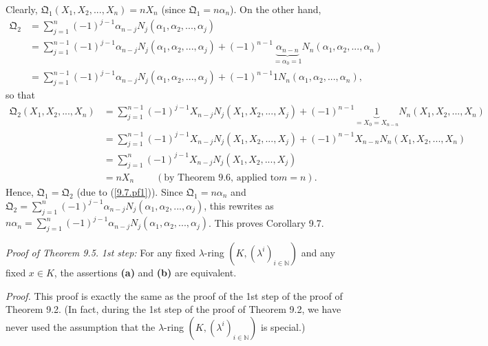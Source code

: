\documentclass[numbers=enddot,12pt,final,onecolumn,notitlepage]{scrartcl}%
\begin{document}
Clearly, $\mathfrak{Q}_{1}\left(  X_{1},X_{2},...,X_{n}\right)  =nX_{n}$
(since $\mathfrak{Q}_{1}=n\alpha_{n}$). On the other hand,
\begin{align*}
\mathfrak{Q}_{2}  &  =\sum\limits_{j=1}^{n}\left(  -1\right)  ^{j-1}%
\alpha_{n-j}N_{j}\left(  \alpha_{1},\alpha_{2},...,\alpha_{j}\right) \\
&  =\sum\limits_{j=1}^{n-1}\left(  -1\right)  ^{j-1}\alpha_{n-j}N_{j}\left(
\alpha_{1},\alpha_{2},...,\alpha_{j}\right)  +\left(  -1\right)
^{n-1}\underbrace{\alpha_{n-n}}_{=\alpha_{0}=1}N_{n}\left(  \alpha_{1}%
,\alpha_{2},...,\alpha_{n}\right) \\
&  =\sum\limits_{j=1}^{n-1}\left(  -1\right)  ^{j-1}\alpha_{n-j}N_{j}\left(
\alpha_{1},\alpha_{2},...,\alpha_{j}\right)  +\left(  -1\right)  ^{n-1}%
1N_{n}\left(  \alpha_{1},\alpha_{2},...,\alpha_{n}\right)  ,
\end{align*}
so that%
\begin{align*}
\mathfrak{Q}_{2}\left(  X_{1},X_{2},...,X_{n}\right)   &  =\sum\limits_{j=1}%
^{n-1}\left(  -1\right)  ^{j-1}X_{n-j}N_{j}\left(  X_{1},X_{2},...,X_{j}%
\right)  +\left(  -1\right)  ^{n-1}\underbrace{1}_{=X_{0}=X_{n-n}}N_{n}\left(
X_{1},X_{2},...,X_{n}\right) \\
&  =\sum\limits_{j=1}^{n-1}\left(  -1\right)  ^{j-1}X_{n-j}N_{j}\left(
X_{1},X_{2},...,X_{j}\right)  +\left(  -1\right)  ^{n-1}X_{n-n}N_{n}\left(
X_{1},X_{2},...,X_{n}\right) \\
&  =\sum\limits_{j=1}^{n}\left(  -1\right)  ^{j-1}X_{n-j}N_{j}\left(
X_{1},X_{2},...,X_{j}\right) \\
&  =nX_{n}\ \ \ \ \ \ \ \ \ \ \left(  \text{by Theorem 9.6, applied to
}m=n\right)  .
\end{align*}
Hence, $\mathfrak{Q}_{1}=\mathfrak{Q}_{2}$ (due to (\ref{9.7.pf1})). Since
$\mathfrak{Q}_{1}=n\alpha_{n}$ and $\mathfrak{Q}_{2}=\sum\limits_{j=1}%
^{n}\left(  -1\right)  ^{j-1}\alpha_{n-j}N_{j}\left(  \alpha_{1},\alpha
_{2},...,\alpha_{j}\right)  $, this rewrites as $n\alpha_{n}=\sum
\limits_{j=1}^{n}\left(  -1\right)  ^{j-1}\alpha_{n-j}N_{j}\left(  \alpha
_{1},\alpha_{2},...,\alpha_{j}\right)  $. This proves Corollary 9.7.

\textit{Proof of Theorem 9.5.} \textit{1st step:} For any fixed $\lambda$-ring
$\left(  K,\left(  \lambda^{i}\right)  _{i\in\mathbb{N}}\right)  $ and any
fixed $x\in K$, the assertions \textbf{(a)} and \textbf{(b)} are equivalent.

\textit{Proof.} This proof is exactly the same as the proof of the 1st step of
the proof of Theorem 9.2. (In fact, during the 1st step of the proof of
Theorem 9.2, we have never used the assumption that the $\lambda$-ring
$\left(  K,\left(  \lambda^{i}\right)  _{i\in\mathbb{N}}\right)  $ is special.)
\end{document}
